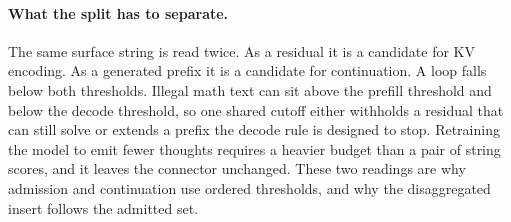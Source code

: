 \paragraph{What the split has to separate.}
The same surface string is read twice.
As a residual it is a candidate for KV encoding.
As a generated prefix it is a candidate for continuation.
A loop falls below both thresholds.
Illegal math text can sit above the prefill threshold and below the decode threshold, so one shared cutoff either withholds a residual that can still solve or extends a prefix the decode rule is designed to stop.
Retraining the model to emit fewer thoughts requires a heavier budget than a pair of string scores, and it leaves the connector unchanged.
These two readings are why admission and continuation use ordered thresholds, and why the disaggregated insert follows the admitted set.
